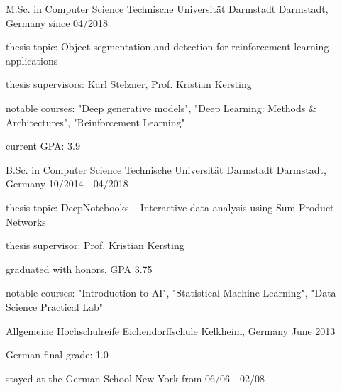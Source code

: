 

\begin{cventries}

  \cventry
    {M.Sc. in Computer Science} %
    {Technische Universität Darmstadt} %
    {Darmstadt, Germany} %
    {since 04/2018} %
    {
        \begin{cvitems}
        \item {thesis topic: Object segmentation and detection for reinforcement learning applications}
        \item {thesis supervisors: Karl Stelzner, Prof. Kristian Kersting}
        \item {notable courses: "Deep generative models", "Deep Learning: Methods \& Architectures", "Reinforcement Learning"}
        \item {current GPA: 3.9}
        \end{cvitems}
    }

  \cventry
    {B.Sc. in Computer Science} %
    {Technische Universität Darmstadt} %
    {Darmstadt, Germany} %
    {10/2014 - 04/2018} %
    {
      \begin{cvitems} %
      \item {thesis topic: DeepNotebooks -- Interactive data analysis using Sum-Product Networks}
      \item {thesis supervisor: Prof. Kristian Kersting}
      \item {graduated with honors, GPA 3.75}
      \item {notable courses: "Introduction to AI", "Statistical Machine Learning", "Data Science Practical Lab"}
      \end{cvitems}
    }

  \cventry
    {Allgemeine Hochschulreife} %
    {Eichendorffschule} %
    {Kelkheim, Germany} %
    {June 2013} %
    {
      \begin{cvitems} %
        \item {German final grade: 1.0}
        \item {stayed at the German School New York from 06/06 - 02/08}
      \end{cvitems}
    }
\end{cventries}
